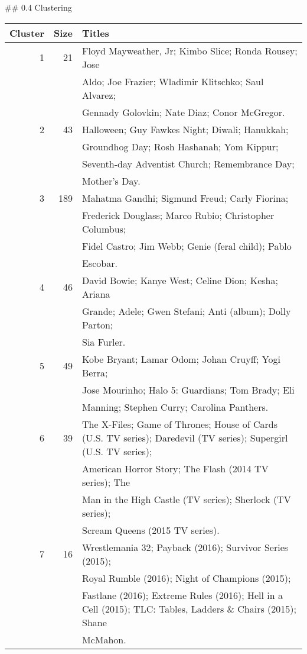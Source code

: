

## 0.4 Clustering

\begin{table}
\begin{tabular}{r r l} \hline \hline Cluster & Size & Titles \\ \hline
1 & 21 & Floyd Mayweather, Jr; Kimbo Slice; Ronda Rousey; Jose \\  & & Aldo; Joe Frazier; Wladimir Klitschko; Saul Alvarez; \\  & & Gennady Golovkin; Nate Diaz; Conor McGregor. \\
2 & 43 & Halloween; Guy Fawkes Night; Diwali; Hanukkah; \\  & & Groundhog Day; Rosh Hashanah; Yom Kippur; \\  & & Seventh-day Adventist Church; Remembrance Day; \\  & & Mother’s Day. \\
3 & 189 & Mahatma Gandhi; Sigmund Freud; Carly Fiorina; \\  & & Frederick Douglass; Marco Rubio; Christopher Columbus; \\  & & Fidel Castro; Jim Webb; Genie (feral child); Pablo \\  & & Escobar. \\
4 & 46 & David Bowie; Kanye West; Celine Dion; Kesha; Ariana \\  & & Grande; Adele; Gwen Stefani; Anti (album); Dolly Parton; \\  & & Sia Furler. \\
5 & 49 & Kobe Bryant; Lamar Odom; Johan Cruyff; Yogi Berra; \\  & & Jose Mourinho; Halo 5: Guardians; Tom Brady; Eli \\  & & Manning; Stephen Curry; Carolina Panthers. \\
6 & 39 & The X-Files; Game of Thrones; House of Cards (U.S. TV series); Daredevil (TV series); Supergirl (U.S. TV series); \\  & & American Horror Story; The Flash (2014 TV series); The \\  & & Man in the High Castle (TV series); Sherlock (TV series); \\  & & Scream Queens (2015 TV series). \\
7 & 16 & Wrestlemania 32; Payback (2016); Survivor Series (2015); \\  & & Royal Rumble (2016); Night of Champions (2015); \\  & & Fastlane (2016); Extreme Rules (2016); Hell in a Cell (2015); TLC: Tables, Ladders \& Chairs (2015); Shane \\  & & McMahon. \\

\end{tabular}
\end{table}

